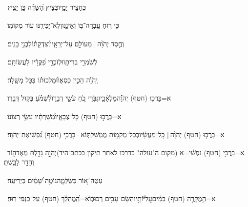 \documentclass[12pt]{article}
\newcommand{\loc}[1]{\textsuperscript{\locf{#1}}}
\begin{document}
{\loc{ טו}~}‏ כֶּחָצִ֣יר יָמָ֑יו{\hfill}כְּצִ֥יץ הַ֝שָּׂדֶ֗ה כֵּ֣ן יָצִֽיץ׃\par

{\loc{ טז}~}‏כִּ֤י ר֣וּחַ עָֽבְרָה־בּ֣וֹ וְאֵינֶ֑נּוּ{\hfill}וְלֹֽא־יַכִּירֶ֖נּוּ ע֣וֹד מְקוֹמֽוֹ׃\par

{\loc{ יז}~}‏וְחֶ֤סֶד יְהֹוָ֨ה |  מֵעוֹלָ֣ם {\hfill}עַל־יְרֵאָ֑יו\newline\hspace*{.5em}וְ֝צִדְקָת֗וֹ{\hfill}לִבְנֵ֥י בָנִֽים׃\par

{\loc{ יח}~}‏לְשֹׁמְרֵ֥י בְרִית֑וֹ{\hfill}וּלְזֹכְרֵ֥י פִ֝קֻּדָ֗יו לַעֲשׂוֹתָֽם׃\par

{\loc{ יט}~}‏יְֽהֹוָ֗ה  הֵכִ֣ין כִּסְא֑וֹ{\hfill}וּ֝מַלְכוּת֗וֹ בַּכֹּ֥ל מָשָֽׁלָה׃\par

{\loc{ כ}~}‏א=בָּרֲכ֥וּ (חטף) יְהֹוָ֗ה{\hfill}מַלְאָ֫כָ֥יו\newline\hspace*{.5em}גִּבֹּ֣רֵי כֹ֭חַ עֹשֵׂ֣י דְבָר֑וֹ{\hfill}לִ֝שְׁמֹ֗עַ בְּק֣וֹל דְּבָרֽוֹ׃\par

{\loc{ כא}~}‏א=בָּרֲכ֣וּ (חטף)  כׇּל־צְבָאָ֑יו{\hfill}מְ֝שָׁרְתָ֗יו עֹשֵׂ֥י רְצוֹנֽוֹ׃\par

{\loc{ כב}~}‏א=בָּרֲכ֤וּ (חטף) יְהֹוָ֨ה |  כׇּֽל־מַעֲשָׂ֗יו{\hfill}בְּכׇל־מְקֹמ֥וֹת מֶמְשַׁלְתּ֑וֹ\newline\hspace*{.5em}א=בָּרֲכִ֥י (חטף) נַ֝פְשִׁ֗י{\hfill}אֶת־יְהֹוָֽה׃\par\pend
\ledpb
\pstart[\subsection*{\textcolor{red}{פרק קד}}]\label{פרק קד}
{\loc{ א}~}‏א=בָּרֲכִ֥י (חטף) נַפְשִׁ֗י{\hfill}=א (מקום ה"עולה" כדרכו לאחר תיקון בכתב־היד)\newline\hspace*{.5em}יְהֹוָ֣ה  גָּדַ֣לְתָּ מְּאֹ֑ד{\hfill}ה֖וֹד וְהָדָ֣ר לָבָֽשְׁתָּ׃\par

{\loc{ ב}~}‏עֹֽטֶה־א֭וֹר כַּשַּׂלְמָ֑ה{\hfill}נוֹטֶ֥ה שָׁ֝מַ֗יִם כַּיְרִיעָֽה׃\par

{\loc{ ג}~}‏א=הַ֥מֲקָרֶ֥ה (חטף) בַמַּ֗יִם{\hfill}עֲֽלִיּ֫וֹתָ֥יו\newline\hspace*{.5em}הַשָּׂם־עָבִ֥ים רְכוּב֑וֹ{\hfill}א=הַֽ֝מֲהַלֵּ֗ךְ (חטף) עַל־כַּנְפֵי־רֽוּחַ׃\par
\end{document}
